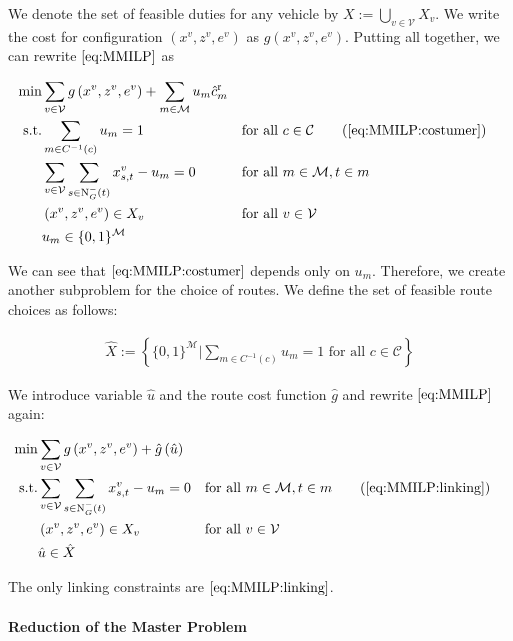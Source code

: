 We denote the set of feasible duties for any vehicle by $X:=\bigcup_{v\in\mathcal{V}}X_v$. We write the cost for configuration $\left(x^v,z^v,e^v\right)$ as $g\left(x^v,z^v,e^v\right)$. Putting all together, we can rewrite $\eqref{eq:MMILP}$ as

\begin{align}
	\min & \sum_{v\in\mathcal{V}}g\left(x^v,z^v,e^v\right) + \sum_{m\in\mathcal{M}} u_m \hat{c}^{\operatorname{r}}_m \nonumber \\
	\text{s.t.} & \sum_{m\in C^{-1}(c)} u_m = 1 && \text{for all } c\in\mathcal{C} \tag{\ref{eq:MMILP:costumer}} \\
	& \sum_{v\in\mathcal{V}}\sum_{s\in\Nin(t)}x^v_{s,t} - u_m = 0 && \text{for all } m\in\mathcal{M},t\in m \label{eq:MMILP:linking}\\
	& \left(x^v,z^v,e^v\right)\in X_v && \text{for all } v\in\mathcal{V} \nonumber \\
	& u_m\in\{0,1\}^{\mathcal{M}} \nonumber
\end{align}

We can see that $\eqref{eq:MMILP:costumer}$ depends only on $u_m$. Therefore, we create another subproblem for the choice of routes. We define the set of feasible route choices as follows:

\begin{align*}
	\hat{X} := \left\{\{0,1\}^{\mathcal{M}}|\sum_{m\in C^{-1}(c)} u_m = 1 \text{ for all } c\in\mathcal{C}\right\}
\end{align*}

We introduce variable $\hat{u}$ and the route cost function $\hat{g}$ and rewrite $\eqref{eq:MMILP}$ again:

\begin{align}
	\min & \sum_{v\in\mathcal{V}}g\left(x^v,z^v,e^v\right) + \hat{g}\left(\hat{u}\right) \nonumber \\
	\text{s.t.} & \sum_{v\in\mathcal{V}}\sum_{s\in\Nin(t)}x^v_{s,t} - u_m = 0 && \text{for all } m\in\mathcal{M},t\in m \tag{\ref{eq:MMILP:linking}}\\
	& \left(x^v,z^v,e^v\right)\in X_v && \text{for all } v\in\mathcal{V} \nonumber \\
	& \hat{u}\in\hat{X} \nonumber
\end{align}

The only linking constraints are $\eqref{eq:MMILP:linking}$.

\paragraph{Reduction of the Master Problem} \parfill

